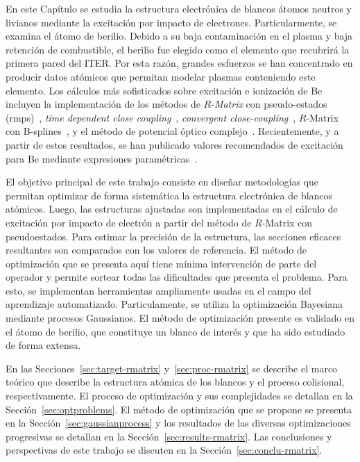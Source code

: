 En este Capítulo se estudia la estructura electrónica de blancos átomos 
neutros y livianos mediante la excitación por impacto de electrones. 
Particularmente, se examina el átomo de berilio. Debido a su baja 
contaminación en el plasma y baja retención de combustible, el berilio 
fue elegido como el elemento que recubrirá la primera pared del ITER. 
Por esta razón, grandes esfuerzos se han concentrado en producir datos 
atómicos que permitan modelar plasmas conteniendo este elemento. Los 
cálculos más sofisticados sobre excitación e ionización de Be incluyen 
la implementación de los métodos de $R$-\textit{Matrix} con 
pseudo-estados (\acs{rmps})~\cite{Bartschat:97,Be_Ballance:03}, 
\textit{time dependent close coupling}~\cite{Colgan:03}, 
\textit{convergent close-coupling}~\cite{Fursa:97,Bray:15}, 
$R$-Matrix con B-splines~\cite{Zatsarinny:16}, y el método de potencial
óptico complejo~\cite{Blanco:17}. Recientemente, y a partir de estos 
resultados, se han publicado valores recomendados de excitación para Be 
mediante expresiones paramétricas~\cite{Dipti:19}. 

El objetivo principal de este trabajo consiste en diseñar metodologías 
que permitan optimizar de forma sistemática la estructura electrónica de 
blancos atómicos. Luego, las estructuras ajustadas son implementadas en 
el cálculo de excitación por impacto de electrón a partir del método de 
$R$-Matrix con pseudoestados. Para estimar la precisión de la estructura,
las secciones eficaces resultantes son comparados con los valores de 
referencia. El método de optimización que se presenta aquí tiene mínima 
intervención de parte del operador y permite sortear todas las 
dificultades que presenta el problema. Para esto, se implementan 
herramientas ampliamente usadas en el campo del aprendizaje automatizado. 
Particulamente, se utiliza la optimización Bayesiana mediante procesos 
Gaussianos. El método de optimización presente es validado en el átomo 
de berilio, que constituye un blanco de interés y que ha sido estudiado 
de forma extensa. 

En las Secciones~\ref{sec:target-rmatrix} y~\ref{sec:proc-rmatrix} se 
describe el marco teórico que describe la estructura atómica de los 
blancos y el proceso colisional, respectivamente. El proceso de 
optimización y sus complejidades se detallan en la 
Sección~\ref{sec:optproblems}. El método de optimización que se propone
se presenta en la Sección~\ref{sec:gaussianprocess} y los resultados de
las diversas optimizaciones progresivas se detallan en la 
Sección~\ref{sec:results-rmatrix}. Las conclusiones y perspectivas de
este trabajo se discuten en la Sección~\ref{sec:conclu-rmatrix}.

